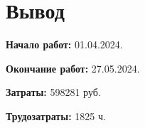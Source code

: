 \chapter*{Вывод}

\textbf{Начало работ:} 01.04.2024. 

\textbf{Окончание работ:} 27.05.2024.

\textbf{Затраты:} 598281 руб.

\textbf{Трудозатраты:} 1825 ч.

